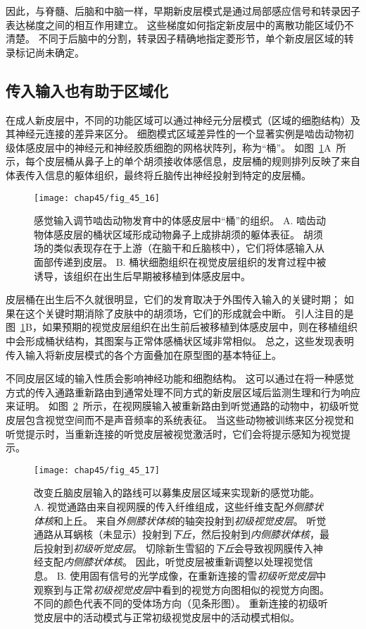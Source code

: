 因此，与脊髓、后脑和中脑一样，早期新皮层模式是通过局部感应信号和转录因子表达梯度之间的相互作用建立。
这些梯度如何指定新皮层中的离散功能区域仍不清楚。
不同于后脑中的分割，转录因子精确地指定菱形节，单个新皮层区域的转录标记尚未确定。



\subsection{传入输入也有助于区域化}

在成人新皮层中，不同的功能区域可以通过神经元分层模式（区域的细胞结构）及其神经元连接的差异来区分。
细胞模式区域差异性的一个显著实例是啮齿动物初级体感皮层中的神经元和神经胶质细胞的网格状阵列，称为“桶”。
如图~\ref{fig:45_16}A~所示，每个皮层桶从鼻子上的单个胡须接收体感信息，皮层桶的规则排列反映了来自体表传入信息的躯体组织，最终将丘脑传出神经投射到特定的皮层桶。


\begin{figure}[htbp]
	\centering
	\texttt{[image: chap45/fig\_45\_16]}
	\caption{感觉输入调节啮齿动物发育中的体感皮层中“桶”的组织\cite{schlaggar1991potential}。
		A. 啮齿动物体感皮层的桶状区域形成动物鼻子上成排胡须的躯体表征。
		胡须场的类似表现存在于上游（在脑干和丘脑核中），它们将体感输入从面部传递到皮层。
		B. 桶状细胞组织在视觉皮层组织的发育过程中被诱导，该组织在出生后早期被移植到体感皮层中。}
	\label{fig:45_16}
\end{figure}


皮层桶在出生后不久就很明显，它们的发育取决于外围传入输入的关键时期；
如果在这个关键时期消除了皮肤中的胡须场，它们的形成就会中断。
引人注目的是图~\ref{fig:45_16}B，如果预期的视觉皮层组织在出生前后被移植到体感皮层中，则在移植组织中会形成桶状结构，其图案与正常体感桶状区域非常相似。
总之，这些发现表明传入输入将新皮层模式的各个方面叠加在原型图的基本特征上。


不同皮层区域的输入性质会影响神经功能和细胞结构。
这可以通过在将一种感觉方式的传入通路重新路由到通常处理不同方式的新皮层区域后监测生理和行为响应来证明。
如图~\ref{fig:45_17}~所示，在视网膜输入被重新路由到听觉通路的动物中，初级听觉皮层包含视觉空间而不是声音频率的系统表征。
当这些动物被训练来区分视觉和听觉提示时，当重新连接的听觉皮层被视觉激活时，它们会将提示感知为视觉提示。


\begin{figure}[htbp]
	\centering
	\texttt{[image: chap45/fig\_45\_17]}
	\caption{改变丘脑皮层输入的路线可以募集皮层区域来实现新的感觉功能\cite{sharma2000induction}。
		A. 视觉通路由来自视网膜的传入纤维组成，这些纤维支配\textit{外侧膝状体核}和上丘。
		来自\textit{外侧膝状体核}的轴突投射到\textit{初级视觉皮层}。
		听觉通路从耳蜗核（未显示）投射到\textit{下丘}，然后投射到\textit{内侧膝状体核}，最后投射到\textit{初级听觉皮层}。
		切除新生雪貂的\textit{下丘}会导致视网膜传入神经支配\textit{内侧膝状体核}。
		因此，听觉皮层被重新调整以处理视觉信息。
		B. 使用固有信号的光学成像，在重新连接的雪\textit{初级听觉皮层}中观察到与正常\textit{初级视觉皮层}中看到的视觉方向图相似的视觉方向图。
		不同的颜色代表不同的受体场方向（见条形图）。
		重新连接的初级听觉皮层中的活动模式与正常初级视觉皮层中的活动模式相似。}
	\label{fig:45_17}
\end{figure}


